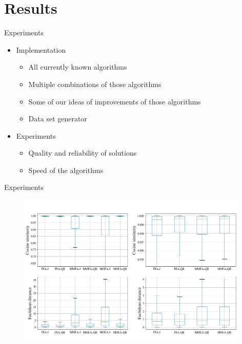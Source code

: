 \documentclass{beamer}
\begin{document}
\section{Results}
\setcounter{subsection}{1}

\begin{frame}{Experiments}

\begin{itemize}
   \item Implementation
   \begin{itemize}
      \item All currently known algorithms
      \item Multiple combinations of those algorithms
      \item Some of our ideas of improvements of those algorithms
      \item Data set generator
   \end{itemize}       
   \item Experiments
   \begin{itemize}
      \item Quality and reliability of solutions
      \item Speed of the algorithms
   \end{itemize}       
\end{itemize}    
\end{frame}

\begin{frame}{Experiments}
\begin{figure}[h]
    \centering
    \includegraphics[width=11cm]{all_distances_feasible}
    
\end{figure}
\end{frame}
\end{document}
